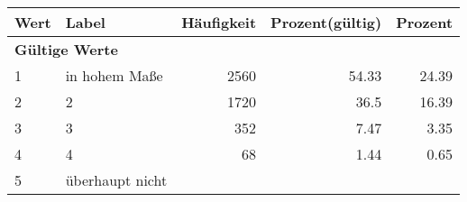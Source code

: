      \begin{longtable}{lXrrr}
     \toprule
     \textbf{Wert} & \textbf{Label} & \textbf{Häufigkeit} & \textbf{Prozent(gültig)} & \textbf{Prozent} \\
     \endhead
     \midrule
     \multicolumn{5}{l}{\textbf{Gültige Werte}}\\

     1 &
     \multicolumn{1}{X}{ in hohem Maße   } &


       \num{2560} &
       \num[round-mode=places,round-precision=2]{54.33} &
         \num[round-mode=places,round-precision=2]{24.39} \\

     2 &
     \multicolumn{1}{X}{ 2   } &


       \num{1720} &
       \num[round-mode=places,round-precision=2]{36.5} &
         \num[round-mode=places,round-precision=2]{16.39} \\

     3 &
     \multicolumn{1}{X}{ 3   } &


       \num{352} &
       \num[round-mode=places,round-precision=2]{7.47} &
         \num[round-mode=places,round-precision=2]{3.35} \\

     4 &
     \multicolumn{1}{X}{ 4   } &


       \num{68} &
       \num[round-mode=places,round-precision=2]{1.44} &
         \num[round-mode=places,round-precision=2]{0.65} \\

     5 &
     \multicolumn{1}{X}{ überhaupt nicht   } &



\end{longtable}
